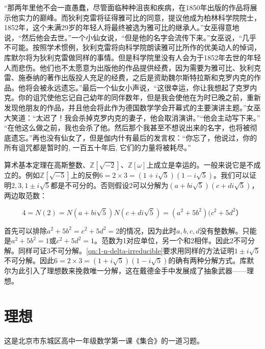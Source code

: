 \documentclass[b5paper]{ctexart}
\begin{document}
\begin{mdframed}
“那两年里他不会一直愚蠢，尽管面临种种沮丧和疾病，在1850年出版的作品将展示他实力的巅峰。而狄利克雷将征得雅可比的同意，提议他成为柏林科学院院士，1852年，这个未满29岁的年轻人将最终被选为雅可比的继承人。”女巫得意地说，“然后他会去世。”一个小仙女说，“但是他的名字会流传下来。”女巫说，“几乎不可能。按照学术惯例，狄利克雷将向科学院朗读雅可比所作的优美动人的悼词，库默尔将为狄利克雷做同样的事情。但是科学院里没有人会为于1852年去世的年轻人而悲伤。他们也不太愿意为出版他的作品提供经费，因为需要为雅可比、狄利克雷、施泰纳的著作出版投人充足的经费，之后是资助魏尔斯特拉斯和克罗内克的作品。他将会被永远遗忘。”最后一个仙女小声说，“这很幸运，你让我想起了克罗内克。你的诅咒使他忘记自己幼年的同伴数年，但是我会使他在为时已晚之前，重新发现他朋友的作品，并且他会将此作为德国数学学会开幕式的主要演讲主题。”女巫大笑道：“太迟了！我会杀掉克罗内克的妻子，他会取消演讲。”“他会主动写下来。” “在他这么做之前，我也会杀了他。然后那个我甚至不想说出来的名字，也将被彻底遗忘。”再也没有仙女了，但是伽内什有最后的发言权：“你忘了，他说过，你的所有诅咒都是暂时的, 一百五十年后, 它们的力量将被耗尽。”
\end{mdframed}

算术基本定理在高斯整数、$\mathbb{Z}[\sqrt{-2}]$、$\mathbb{Z}[\omega]$上成立是幸运的。一般来说它是不成立的。例如$\mathbb{Z}[\sqrt{-5}]$上的反例$6 = 2 \times 3 = (1 + i\sqrt{5})(1 - i\sqrt{5})$。我们可以证明$2, 3, 1 \pm i\sqrt{5}$都是不可分的。否则假设2可以分解为$(a + bi\sqrt{5})(c + di\sqrt{5})$，两边取范数：

\[
4 = N(2) = N(a + bi\sqrt{5})N(c + di\sqrt{5}) = (a^2 + 5b^2)(c^2 + 5d^2）
\]

首先可以排除$a^2 + 5b^2 = c^2 + 5d^2 = 2$的情况，因为此时$a, b, c, d$没有整数解。只能是$a^2 + 5b^2 = 1$或$c^2 + 5d^2 = 1$。范数为1对应单位，另一个和2相伴。因此2不可分解。同样可证3不可分解。\cref{qn:1-n-delta-irreducible}要求用同样的方法证明$1 \pm i\sqrt{5}$不可分解。因此$6 = 2 \times 3 = (1 + i\sqrt{5})(1 - i\sqrt{5})$的确有两种分解方式。库默尔为此引入了理想数来挽救唯一分解，这在戴德金手中发展成了抽象武器——理想。

\section{理想}
这是北京市东城区高中一年级数学第一课《集合》的一道习题。
\end{document}
